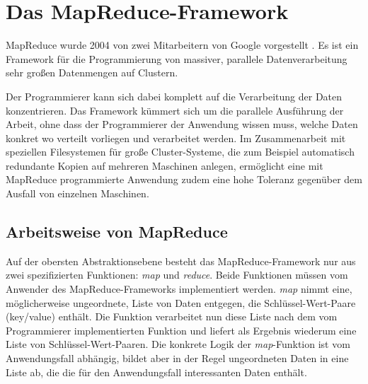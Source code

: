 \section{Das MapReduce-Framework}
MapReduce wurde 2004 von zwei Mitarbeitern von Google vorgestellt \cite{dean2008mapreduce}. Es ist ein Framework
für die Programmierung von massiver, parallele Datenverarbeitung sehr großen Datenmengen auf Clustern.



Der Programmierer
kann sich dabei komplett auf die Verarbeitung der Daten konzentrieren. Das Framework kümmert sich um die parallele
Ausführung der Arbeit, ohne dass der Programmierer der Anwendung wissen muss, welche Daten konkret wo verteilt vorliegen
und verarbeitet werden. 
Im Zusammenarbeit mit speziellen Filesystemen 
für große Cluster-Systeme, die zum Beispiel automatisch redundante Kopien auf mehreren Maschinen anlegen, ermöglicht
eine mit MapReduce programmierte Anwendung zudem eine hohe Toleranz gegenüber dem Ausfall von einzelnen Maschinen.

\subsection{Arbeitsweise von MapReduce}
Auf der obersten Abstraktionsebene besteht das MapReduce-Framework nur aus zwei spezifizierten Funktionen: \textit{map} und \textit{reduce}.
Beide Funktionen müssen vom Anwender des MapReduce-Frameworks implementiert werden.
\textit{map} nimmt eine, möglicherweise ungeordnete, Liste von Daten entgegen, die Schlüssel-Wert-Paare (key/value) enthält. Die Funktion 
verarbeitet nun diese Liste nach dem vom Programmierer implementierten Funktion und liefert als Ergebnis wiederum eine
Liste von Schlüssel-Wert-Paaren. Die konkrete Logik der \textit{map}-Funktion ist vom Anwendungsfall abhängig, bildet aber in der Regel
ungeordneten Daten in eine Liste ab, die die für den Anwendungsfall interessanten Daten enthält. 



